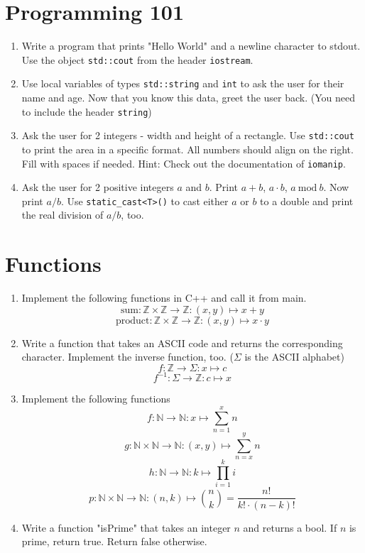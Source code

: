 \documentclass[12pt, a4paper]{article}
\begin{document}
\section*{Programming 101}
\begin{enumerate}
    \item Write a program that prints "Hello World" and a newline character to stdout. Use the object \lstinline{std::cout} from the header \lstinline{iostream}.
    \item Use local variables of types \lstinline{std::string} and \lstinline{int} to ask the user for their name and age. Now that you know this data, greet the user back. (You need to include the header \lstinline{string})
    \item Ask the user for 2 integers - width and height of a rectangle. Use \lstinline{std::cout} to print the area in a specific format. All numbers should align on the right. Fill with spaces if needed. Hint: Check out the documentation of \lstinline{iomanip}.
    \item Ask the user for 2 positive integers $a$ and $b$. Print $a + b$, $a \cdot b$, $a \ \textrm{mod} \ b$. Now print $a / b$. Use \lstinline{static_cast<T>()} to cast either $a$ or $b$ to a double and print the real division of $a / b$, too.
\end{enumerate}
\section*{Functions}
\begin{enumerate}
    \item Implement the following functions in C++ and call it from main.
    $$ \textrm{sum}: \mathbb{Z} \times \mathbb{Z} \to \mathbb{Z}: (x,y) \mapsto x + y $$
    $$ \textrm{product}: \mathbb{Z} \times \mathbb{Z} \to \mathbb{Z}: (x,y) \mapsto x \cdot y $$
    \item Write a function that takes an ASCII code and returns the corresponding character. Implement the inverse function, too. ($\Sigma$ is the ASCII alphabet)
    $$ f: \mathbb{Z} \to \Sigma: x \mapsto c $$
    $$ f^{-1}: \Sigma \to \mathbb{Z}: c \mapsto x $$
    \item Implement the following functions
    $$f: \mathbb{N} \to \mathbb{N}: x \mapsto \sum_{n=1}^{x} n$$
    $$g: \mathbb{N} \times \mathbb{N} \to \mathbb{N}: (x,y) \mapsto \sum_{n=x}^{y} n $$
    $$h: \mathbb{N} \to \mathbb{N}: k \mapsto \prod_{i=1}^{k} i$$
    $$p: \mathbb{N} \times \mathbb{N} \to \mathbb{N}: (n, k) \mapsto \binom{n}{k} = \frac{n!}{k! \cdot (n-k)!}$$
    \item Write a function "isPrime" that takes an integer $n$ and returns a bool. If $n$ is prime, return true. Return false otherwise.

\end{enumerate}
\end{document}
